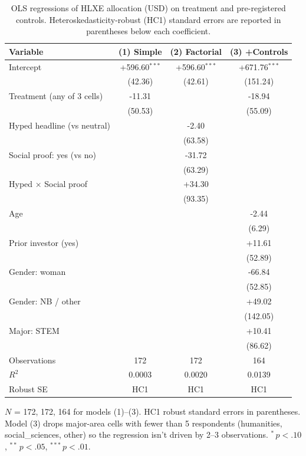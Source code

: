 \begin{table}[!htbp]
  \centering
  \begin{threeparttable}
  \caption{OLS regressions of HLXE allocation (USD) on treatment and pre-registered controls. Heteroskedasticity-robust (HC1) standard errors are reported in parentheses below each coefficient.}
  \label{tab:regressions}
  \begin{tabular}{lccc}
\toprule
Variable & (1) Simple & (2) Factorial & (3) +Controls \\
\midrule
Intercept & +596.60$^{***}$ & +596.60$^{***}$ & +671.76$^{***}$ \\
 & (42.36) & (42.61) & (151.24) \\
Treatment (any of 3 cells) & -11.31 &  & -18.94 \\
 & (50.53) &  & (55.09) \\
Hyped headline (vs neutral) &  & -2.40 &  \\
 &  & (63.58) &  \\
Social proof: yes (vs no) &  & -31.72 &  \\
 &  & (63.29) &  \\
Hyped × Social proof &  & +34.30 &  \\
 &  & (93.35) &  \\
Age &  &  & -2.44 \\
 &  &  & (6.29) \\
Prior investor (yes) &  &  & +11.61 \\
 &  &  & (52.89) \\
Gender: woman &  &  & -66.84 \\
 &  &  & (52.85) \\
Gender: NB / other &  &  & +49.02 \\
 &  &  & (142.05) \\
Major: STEM &  &  & +10.41 \\
 &  &  & (86.62) \\
Observations & 172 & 172 & 164 \\
$R^2$ & 0.0003 & 0.0020 & 0.0139 \\
Robust SE & HC1 & HC1 & HC1 \\
\bottomrule
\end{tabular}
    \begin{tablenotes}\footnotesize
      \item $N$ = 172, 172, 164 for models (1)–(3). HC1 robust standard errors in parentheses. Model (3) drops major-area cells with fewer than 5 respondents (humanities, social\_sciences, other) so the regression isn't driven by 2--3 observations. ${}^{*}\,p<.10$, ${}^{**}\,p<.05$, ${}^{***}\,p<.01$.
    \end{tablenotes}
  \end{threeparttable}
\end{table}

